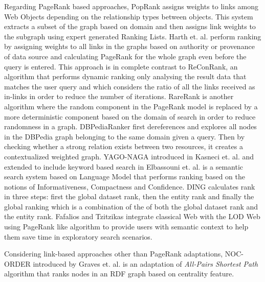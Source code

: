 Regarding PageRank based approaches, PopRank\cite{nie2005object} 
assigns weights to links among Web Objects
depending on the relationship types between objects.
This system extracts a subset of the graph
based on domain and then assigns link weights
to the subgraph using expert generated Ranking Lists.
Harth et. al.\cite{harth2009using} perform ranking 
by assigning weights to all links in the graphs
based on authority or provenance of data source
and calculating PageRank for the whole
graph even before the query is entered.
This approach is in complete contrast
to ReConRank\cite{hogan2006reconrank}, an
algorithm that performs dynamic ranking only
analysing the result data that matches the user query and 
which considers the ratio of all the links received as
in-links in order to reduce the number of iterations.
RareRank\cite{wei2009semantic} is another 
algorithm where the random component
in the PageRank model is replaced by
a more deterministic component based on
the domain of search in order to reduce randomness in a graph.
DBPediaRanker\cite{mirizzi2010ranking} 
first dereferences and explores all nodes in the
DBPedia graph belonging to the same
domain given a query. Then by checking whether
a strong relation exists between two resources,
it creates a contextualized weighted graph.
YAGO-NAGA introduced in Kasneci et. al.\cite{kasneci2008naga}
and extended to include keyword based search in
Elbassouni et. al.\cite{elbassuoni2009language} is
a semantic search system based on Language Model that
performs ranking based on the notions of Informativeness,
Compactness and Confidence.
DING\cite{delbru2010hierarchical} 
calculates rank in three steps:
first the global dataset rank,
then the entity rank and finally the global ranking
which is a combination of the of both the global
dataset rank and the entity rank.
Fafalios and Tzitzikas\cite{fafalios2014post} integrate
classical Web with the LOD Web using PageRank like algorithm 
to provide users with semantic context 
to help them save
time in exploratory search scenarios.
 
Considering link-based approaches other than
PageRank adaptations, 
NOC-ORDER\cite{graves2008method} introduced by
Graves et. al. is an adaptation of \emph{All-Pairs Shortest Path}
algorithm that ranks nodes in an RDF graph
based on centrality feature.

